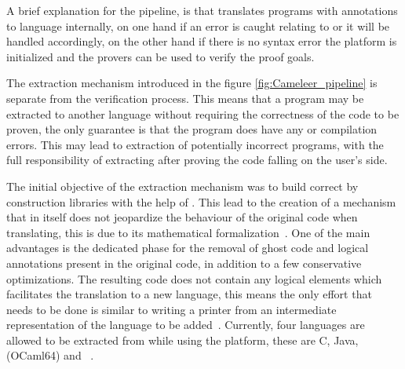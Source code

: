 A brief explanation for the pipeline, is that \cameleer translates \ocaml programs with \gospel annotations to \whyml language internally,
on one hand if an error is caught relating to \ocaml or \whyml it will be handled accordingly, on the other hand if there is no syntax error
the \whythree platform is initialized and the provers can be used to verify the proof goals.

The extraction mechanism introduced in the figure \ref{fig:Cameleer_pipeline} is separate from the verification process.
This means that a program may be extracted to another language without requiring the correctness of the code to be proven, 
the only guarantee is that the program does have any \ocaml or \gospel compilation errors. 
This may lead to extraction of potentially incorrect \ocaml programs, with the full responsibility of extracting after proving the
code falling on the user's side. 

The initial objective of the extraction mechanism was to build correct by construction libraries with the help of \whythree. This lead
to the creation of a mechanism that in itself does not jeopardize the behaviour of the original code when translating, this is due to its 
mathematical formalization~\cite{Pereira18}. One of the main advantages is the dedicated phase for the removal of ghost code and logical
annotations present in the original \whyml code, in addition to a few conservative optimizations. The resulting code does not contain 
any logical elements which facilitates the translation to a new language, this means the only effort that needs to be done
is similar to writing a printer from an intermediate representation of the language to be added~\cite{Pereira18}. Currently, four languages 
are allowed to be extracted from \whyml while using the \whythree platform, these are C, Java, \ocaml (OCaml64) and 
\cml~\cite{Why3Extract, Pereira18}.